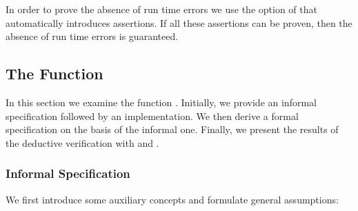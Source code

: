 In order to prove the absence of run time errors we use
the  option of \wpframac that automatically introduces \acsl
assertions. If all these assertions can be proven, then
the absence of run time errors is guaranteed.


\clearpage

\subsection{The Function \peek}
\label{peek}


In this section we examine the function \peek.
Initially, we provide an informal specification 
followed by an implementation.
We then derive a formal specification on the basis of the informal one. 
Finally, we present the results of the deductive verification with \framac and \wpframac.


\subsubsection{Informal Specification}
\label{informal-peek}


We first introduce some auxiliary concepts and formulate general assumptions:

